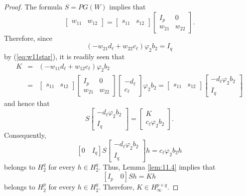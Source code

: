 \documentclass[12pt,twoside,a4paper]{amsart}
\theoremstyle{definition}
\numberwithin{equation}{section}
\begin{document}
\begin{proof}
The formula $S=PG(W)$ implies that
$$
\begin{bmatrix}w_{11}&w_{12}\end{bmatrix}= \begin{bmatrix}s_{11}&s_{12}
\end{bmatrix}\begin{bmatrix}I_p&0\\w_{21}&w_{22}\end{bmatrix}.
$$
Therefore, since
$$
(-w_{21}d_\ell+w_{22}c_\ell)\varphi_2b_2=I_q
$$
by (\ref{eq:w11star}), it is readily seen that
\begin{eqnarray*}
K&=&(-w_{11}d_\ell+w_{12}c_\ell)\varphi_2b_2\\
&=&\begin{bmatrix}s_{11}&s_{12}
\end{bmatrix}\begin{bmatrix}I_p&0\\w_{21}&w_{22}\end{bmatrix}\begin{bmatrix}
-d_\ell\\c_\ell\end{bmatrix}\varphi_2b_2
=\begin{bmatrix}s_{11}&s_{12}
\end{bmatrix}\begin{bmatrix}-d_\ell\varphi_2b_2\\I_q\end{bmatrix}
\end{eqnarray*}
and hence that
\begin{equation}
\label{eq:jun11a9}
S\begin{bmatrix}-d_\ell\varphi_2b_2\\I_q\end{bmatrix}=\begin{bmatrix}K\\
c_\ell\varphi_2b_2\end{bmatrix}.
\end{equation}
Consequently,
$$
[0\quad I_q]S\begin{bmatrix}-d_\ell\varphi_2b_2\\I_q\end{bmatrix}h=
c_\ell\varphi_2b_2h
$$
belongs to $H_2^q$ for every $h\in H_2^q$. Thus, Lemma \ref{lem:11.4}
implies that
$$
[I_p\quad 0]Sh=Kh
$$
belongs to $H_2^p$ for every $h\in H_2^q$. Therefore, $K\in H_\infty^{p\times q}$.


\end{proof}
\end{document}
